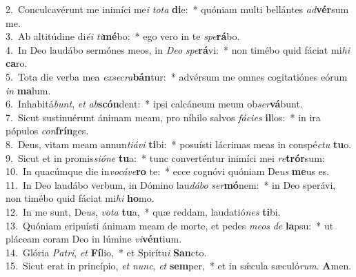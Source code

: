 {2.~}Conculcavérunt me inimíci me\textit{i} \textit{to}\textit{ta} \textbf{di}e:~* quóniam multi bellántes \textit{ad}\textbf{vér}sum me.\\
{3.~}Ab altitúdine di\textit{é}\textit{i} \textit{ti}\textbf{mé}bo:~* ego vero in te \textit{spe}\textbf{rá}bo.\\
{4.~}In Deo laudábo sermónes meos, in \textit{De}\textit{o} \textit{spe}\textbf{rá}vi:~* non timébo quid fáciat mi\textit{hi} \textbf{ca}ro.\\
{5.~}Tota die verba mea \textit{ex}\textit{se}\textit{cra}\textbf{bán}tur:~* advérsum me omnes cogitatiónes eórum \textit{in} \textbf{ma}lum.\\
{6.~}Inhabitá\textit{bunt}, \textit{et} \textit{ab}\textbf{scón}dent:~* ipsi calcáneum meum ob\textit{ser}\textbf{vá}bunt.\\
{7.~}Sicut sustinuérunt ánimam meam, pro níhilo salvos \textit{fá}\textit{ci}\textit{es} \textbf{il}los:~* in ira pópulos \textit{con}\textbf{frín}ges.\\
{8.~}Deus, vitam meam annun\textit{ti}\textit{á}\textit{vi} \textbf{ti}bi:~* posuísti lácrimas meas in conspé\textit{ctu} \textbf{tu}o.\\
{9.~}Sicut et in promis\textit{si}\textit{ó}\textit{ne} \textbf{tu}a:~* tunc converténtur inimíci mei \textit{re}\textbf{trór}sum:\\
{10.~}In quacúmque die in\textit{vo}\textit{cá}\textit{ve}\textbf{ro} te:~* ecce cognóvi quóniam De\textit{us} \textbf{me}us es.\\
{11.~}In Deo laudábo verbum, in Dómino lau\textit{dá}\textit{bo} \textit{ser}\textbf{mó}nem:~* in Deo sperávi, non timébo quid fáciat mi\textit{hi} \textbf{ho}mo.\\
{12.~}In me sunt, De\textit{us}, \textit{vo}\textit{ta} \textbf{tu}a,~* quæ reddam, laudatió\textit{nes} \textbf{ti}bi.\\
{13.~}Quóniam eripuísti ánimam meam de morte, et pedes \textit{me}\textit{os} \textit{de} \textbf{la}psu:~* ut pláceam coram Deo in lúmine \textit{vi}\textbf{vén}tium.\\
{14.~}Glória \textit{Pa}\textit{tri}, \textit{et} \textbf{Fí}lio,~* et Spirítu\textit{i} \textbf{San}cto.\\
{15.~}Sicut erat in princípio, \textit{et} \textit{nunc}, \textit{et} \textbf{sem}per,~* et in sǽcula sæculó\textit{rum}. \textbf{A}men.\\
